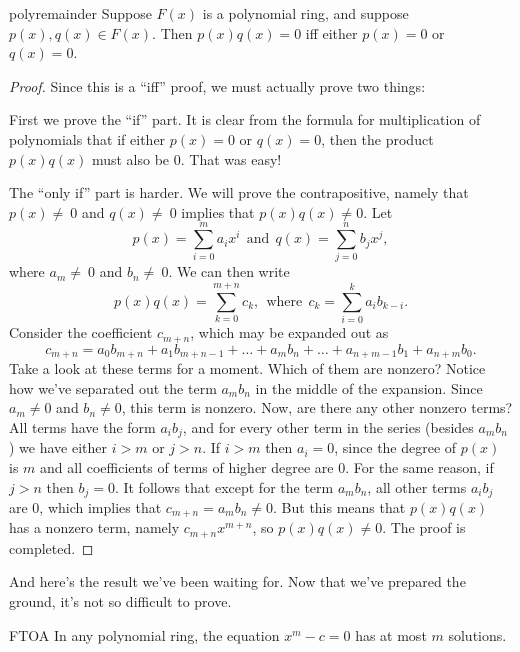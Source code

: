 \begin {prop}{polyremainder}
Suppose $F(x)$ is a polynomial ring, and suppose $p(x),  q(x) \in F(x)$. Then $p(x)  q(x)=0$ iff either $p(x)=0$ or $q(x)=0$.
\end {prop}
\begin {proof}
Since this is a ``iff'' proof, we must actually prove two things:  

First we prove the ``if'' part.  It is clear from the formula for multiplication of polynomials that if either $p(x)=0$ or $q(x)=0$, then the product $p(x)q(x)$ must also be 0. That was easy!

The ``only if'' part is harder. We will prove the contrapositive, namely that  $p(x)\neq\ 0$ and  $ q(x)\neq\ 0$ implies that  $p(x)q(x) \neq 0$.
Let 
\[p(x) =  \sum_{i=0}^{m} a_i x^i \mathrm{~~and~~} q(x) =  \sum_{j=0}^{n} b_j x^j,\] 
where $a_m \neq\ 0$ and $b_n\neq\ 0$.
We can then write
 \[p(x) q(x) = \sum_{k=0}^{m+n} c_k, \mathrm{~~where~~} c_{k} =  \sum_{i=0}^{k}a_i b_{k-i}.\]
Consider the coefficient $c_{m+n}$, which may be expanded out as
\[
c_{m+n} =  a_0 b_{m+n} + a_1 b_{m+n-1} + \ldots  + a_{m}b_{n} + \dots +  a_{n+m-1}b_{1} + a_{n+m}b_{0}.
\]
Take a look at these terms for a moment. Which of them are nonzero?  Notice how we've separated out the term $a_{m}b_{n}$ in the middle of the expansion. Since $a_{m} \neq 0$ and $b_{n} \neq 0$, this term is nonzero. Now, are there
any other nonzero terms?  All terms have the  form $a_i b_j$, and for every other term in the series (besides $a_{m}b_{n}$) we have either $i>m$ or $j>n$.  If $i>m$ then $a_i=0$, since the degree of $p(x)$ is $m$ and all coefficients of terms of higher degree are 0.  For the same reason, if $j>n$ then $b_j=0$. It follows that except for the term $a_{m}b_{n}$, all other terms $a_ib_j$ are 0, which implies that $c_{m+n} = a_mb_n \neq 0$. But this means that $p(x)q(x)$ has a nonzero term, namely
$c_{m+n}x^{m+n}$, so $p(x)q(x) \neq 0$.    The proof is completed.
\end{proof}

And here's the result we've been waiting for. Now that we've prepared the ground, it's not so difficult to prove.

\begin {prop}{FTOA}
In any polynomial ring, the equation $x^m-c=0$ has at most $m$ solutions.
\end {prop}



